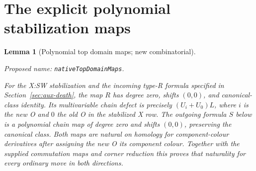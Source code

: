 \documentclass[11pt,a4paper]{article}
\newtheorem{lemma}[theorem]{Lemma}
\theoremstyle{remark}
\newcommand{\formalname}[1]{\leavevmode\par\noindent\textnormal{\small Proposed name: \texttt{#1}.}\par\smallskip}
\begin{document}
\section{The explicit polynomial stabilization maps}
\label{sec:type-r-independent}

\begin{lemma}[Polynomial top domain maps; new combinatorial]
\label{lem:top-domain-maps}
\formalname{nativeTopDomainMaps}
For the X:SW stabilization and the incoming type-R formula specified
in Section~\ref{sec:aux-death}, the map $R$ has degree zero, shifts
$(0,0)$, and canonical-class identity.  Its multivariable chain
defect is precisely $(U_i+U_0)L$, where $i$ is the new O and $0$
the old O in the stabilized X row.  The outgoing formula $S$ below
is a polynomial chain map of degree zero and shifts $(0,0)$,
preserving the canonical class.  Both maps are natural on homology
for component-colour derivatives after assigning the new O its
component colour.  Together with the supplied commutation maps and
corner reduction this proves that naturality for every ordinary
move in both directions.
\end{lemma}
\end{document}
